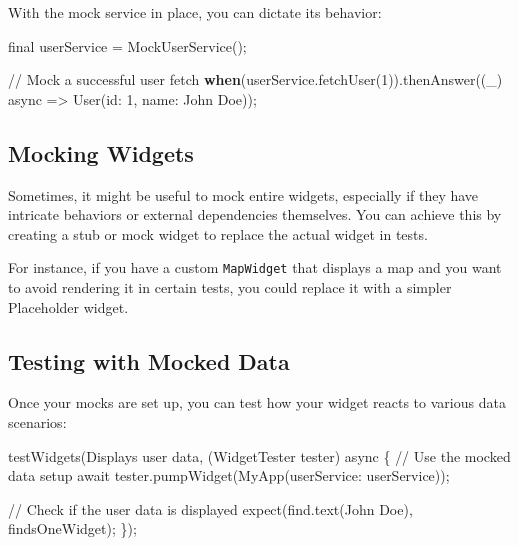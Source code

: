 \documentclass[
]{article}
\newenvironment{Shaded}{\begin{snugshade}}{\end{snugshade}}
\newcommand{\AttributeTok}[1]{\textcolor[rgb]{0.16,0.50,0.73}{#1}}
\newcommand{\CommentTok}[1]{\textcolor[rgb]{0.48,0.49,0.49}{#1}}
\newcommand{\ControlFlowTok}[1]{\textcolor[rgb]{0.99,0.74,0.29}{\textbf{#1}}}
\newcommand{\DecValTok}[1]{\textcolor[rgb]{0.96,0.45,0.00}{#1}}
\newcommand{\NormalTok}[1]{\textcolor[rgb]{0.81,0.81,0.76}{#1}}
\newcommand{\OperatorTok}[1]{\textcolor[rgb]{0.81,0.81,0.76}{#1}}
\newcommand{\StringTok}[1]{\textcolor[rgb]{0.96,0.31,0.31}{#1}}
\begin{document}
With the mock service in place, you can dictate its behavior:

\begin{Shaded}
\begin{Highlighting}[]
\AttributeTok{final}\NormalTok{ userService }\OperatorTok{=}\NormalTok{ MockUserService();}

\CommentTok{// Mock a successful user fetch}
\ControlFlowTok{when}\NormalTok{(userService}\OperatorTok{.}\NormalTok{fetchUser(}\DecValTok{1}\NormalTok{))}\OperatorTok{.}\NormalTok{thenAnswer((\_) }\AttributeTok{async} \OperatorTok{=\textgreater{}}\NormalTok{ User(id}\OperatorTok{:} \DecValTok{1}\OperatorTok{,}\NormalTok{ name}\OperatorTok{:} \StringTok{\textquotesingle{}John Doe\textquotesingle{}}\NormalTok{));}
\end{Highlighting}
\end{Shaded}

\subsection{Mocking Widgets}\label{mocking-widgets}

Sometimes, it might be useful to mock entire widgets, especially if they
have intricate behaviors or external dependencies themselves. You can
achieve this by creating a stub or mock widget to replace the actual
widget in tests.

For instance, if you have a custom \texttt{MapWidget} that displays a
map and you want to avoid rendering it in certain tests, you could
replace it with a simpler Placeholder widget.

\subsection{Testing with Mocked Data}\label{testing-with-mocked-data}

Once your mocks are set up, you can test how your widget reacts to
various data scenarios:

\begin{Shaded}
\begin{Highlighting}[]
\NormalTok{testWidgets(}\StringTok{\textquotesingle{}Displays user data\textquotesingle{}}\OperatorTok{,}\NormalTok{ (WidgetTester tester) }\AttributeTok{async} \OperatorTok{\{}
  \CommentTok{// Use the mocked data setup}
  \AttributeTok{await}\NormalTok{ tester}\OperatorTok{.}\NormalTok{pumpWidget(MyApp(userService}\OperatorTok{:}\NormalTok{ userService));}

  \CommentTok{// Check if the user data is displayed}
\NormalTok{  expect(find}\OperatorTok{.}\NormalTok{text(}\StringTok{\textquotesingle{}John Doe\textquotesingle{}}\NormalTok{)}\OperatorTok{,}\NormalTok{ findsOneWidget);}
\OperatorTok{\}}\NormalTok{);}
\end{Highlighting}
\end{Shaded}
\end{document}
